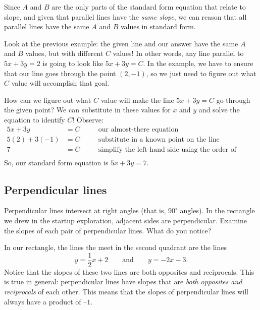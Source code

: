 Since $A$ and $B$ are the only parts of the standard form equation that relate to slope, and given that parallel lines have the \textit{same slope}, we can reason that all parallel lines have the same $A$ and $B$ values in standard form.

Look at the previous example: the given line and our answer have the same $A$ and $B$ values, but with different $C$ values! In other words, any line parallel to $5x+3y=2$ is going to look like $5x+3y=C$. In the example, we have to ensure that our line goes through the point $(2,-1)$, so we just need to figure out what $C$ value will accomplish that goal.

How can we figure out what $C$ value will make the line $5x + 3y = C$ go through the given point? We can substitute in these values for $x$ and $y$ and solve the equation to identify $C$! Observe:
\[\begin{aligned}
5x + 3y &= C
&& \quad\text{our almost-there equation}\\
5(2) + 3(-1) &= C
&& \quad\text{substitute in a known point on the line}\\
7 &= C
&& \quad\text{simplify the left-hand side using the order of operations}\\
\end{aligned}\]
So, our standard form equation is $5x + 3y = 7$.

\subsection{Perpendicular lines}

Perpendicular lines intersect at right angles (that is, $90^\circ$ angles). In the rectangle we drew in the startup exploration, adjacent sides are perpendicular. Examine the slopes of each pair of perpendicular lines. What do you notice?

In our rectangle, the lines the meet in the second quadrant are the lines \[y=\frac{1}{2}x+2 \qquad\text{and}\qquad y=-2x-3.\] Notice that the slopes of these two lines are both opposites and reciprocals. This is true in general: perpendicular lines have slopes that are \textit{both opposites and reciprocals} of each other. This means that the slopes of perpendicular lines will always have a product of $–1$.

